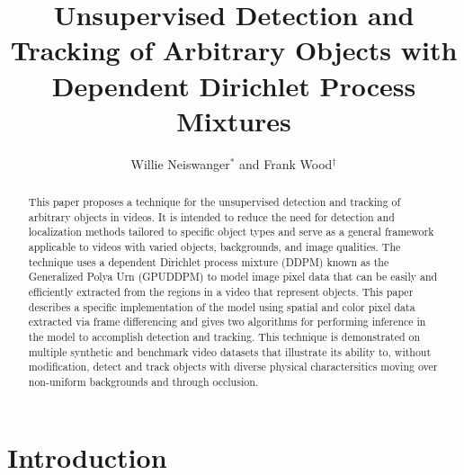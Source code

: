 \documentclass[twocolumn, final]{svjour3}
\begin{document}

\title{Unsupervised Detection and Tracking of Arbitrary Objects with Dependent Dirichlet Process Mixtures}
\author{Willie Neiswanger$^{*}$ and Frank Wood$^{\dagger}$}
\date{}  %
\maketitle



\begin{abstract}
This paper proposes a technique for the unsupervised detection and tracking of arbitrary objects in videos. It is intended to reduce the need for detection and localization methods tailored to specific object types and serve as a general framework applicable to videos with varied objects, backgrounds, and image qualities. The technique uses a dependent Dirichlet process mixture (DDPM) known as the Generalized Polya Urn (GPUDDPM) to model image pixel data that can be easily and efficiently extracted from the regions in a video that represent objects. This paper describes a specific implementation of the model using spatial and color pixel data extracted via frame differencing and gives two algorithms for performing inference in the model to accomplish detection and tracking. This technique is demonstrated on multiple synthetic and benchmark video datasets that illustrate its ability to, without modification, detect and track objects with diverse physical charactersitics moving over non-uniform backgrounds and through occlusion.
\end{abstract}




\section{Introduction}
\label{sec:introduction}
\end{document}
